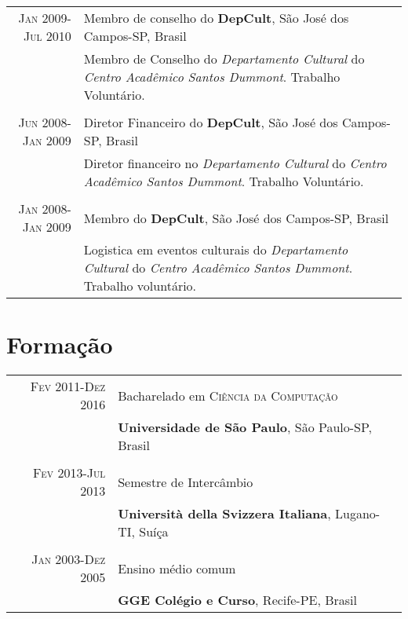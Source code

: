\documentclass[a4paper,10pt]{article} %
\begin{document}
\begin{tabular}{r|p{11cm}}

\textsc{Jan 2009-Jul 2010} & Membro de conselho do \textbf{DepCult}, São José dos Campos-SP, Brasil \emph{}\\
& \footnotesize{Membro de Conselho do \textit{Departamento Cultural} do 
       \emph{Centro Acadêmico Santos Dummont}. Trabalho Voluntário.}\\
	\multicolumn{2}{c}{} \\



\textsc{Jun 2008-Jan 2009} & Diretor Financeiro do \textbf{DepCult}, São José dos Campos-SP, Brasil \emph{}\\
& \footnotesize{Diretor financeiro no \emph{Departamento Cultural} do 
       \emph{Centro Acadêmico Santos Dummont}. Trabalho Voluntário.}\\
\multicolumn{2}{c}{} \\



\textsc{Jan 2008-Jan 2009} & Membro do \textbf{DepCult}, São José dos Campos-SP, Brasil \emph{}\\
& \footnotesize{Logistica em eventos culturais do \emph{Departamento Cultural} do \emph{Centro Acadêmico Santos Dummont}. Trabalho voluntário.}\\

\end{tabular}



\section{Formação}

\begin{tabular}{r|p{11cm}}
\textsc{Fev} 2011-\textsc{Dez} 2016& Bacharelado em \textsc{}\textsc{Ciência da Computação} \\& \normalsize\textbf{Universidade de São Paulo}, São Paulo-SP, Brasil\\
\multicolumn{2}{c}{}\\


\textsc{Fev} 2013-\textsc{Jul} 2013 & Semestre de Intercâmbio\\& \textbf{Università della Svizzera Italiana}, Lugano-TI, Suíça\\
\multicolumn{2}{c}{} \\
    

\textsc{Jan} 2003-\textsc{Dez} 2005& Ensino médio comum\\&\textbf{GGE Colégio e Curso}, Recife-PE, Brasil\\
\end{tabular}
\end{document}
